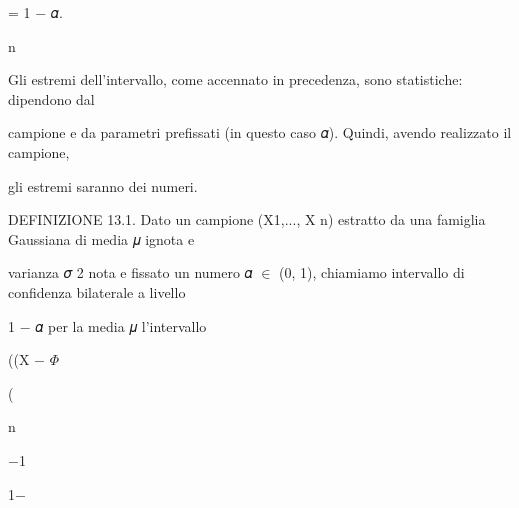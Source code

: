 \documentclass[a4paper,portrait,12pt]{article}
\begin{document}
\begin{flushleft}
= 1 $-$ 𝛼.
\end{flushleft}


\begin{flushleft}
n
\end{flushleft}





\begin{flushleft}
Gli estremi dell'intervallo, come accennato in precedenza, sono statistiche: dipendono dal
\end{flushleft}


\begin{flushleft}
campione e da parametri prefissati (in questo caso 𝛼). Quindi, avendo realizzato il campione,
\end{flushleft}


\begin{flushleft}
gli estremi saranno dei numeri.
\end{flushleft}


\begin{flushleft}
DEFINIZIONE 13.1. Dato un campione (X1,..., X n) estratto da una famiglia Gaussiana di media 𝜇 ignota e
\end{flushleft}


\begin{flushleft}
varianza 𝜎 2 nota e fissato un numero 𝛼 $\in$ (0, 1), chiamiamo intervallo di confidenza bilaterale a livello
\end{flushleft}


\begin{flushleft}
1 $-$ 𝛼 per la media 𝜇 l'intervallo
\end{flushleft}





\begin{flushleft}
((X $-$ $\Phi$
\end{flushleft}


(


\begin{flushleft}
n
\end{flushleft}





$-$1





1$-$
\end{document}
